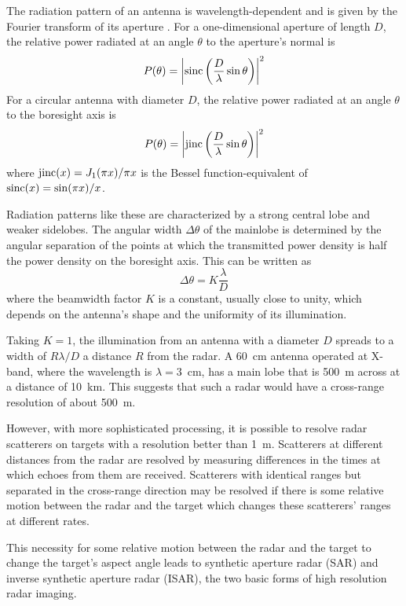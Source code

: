 The radiation pattern of an antenna is wavelength-dependent and is given 
by the Fourier transform of its aperture \cite{Bra86}.  For a one-dimensional
aperture of length $D$, the relative power radiated at an angle $\theta$ to 
the aperture's normal is
\begin{equation}
P(\theta)=\left|{\mathop{\rm sinc}\nolimits}\left(\frac{D}{\lambda}\sin\theta\right)\right|^2
\end{equation}
For a circular antenna with diameter $D$, the relative power radiated at an 
angle $\theta$ to the boresight axis is
\begin{equation}
P(\theta)=\left|{\mathop{\rm jinc}\nolimits}\left(\frac{D}{\lambda}\sin\theta\right)\right|^2
\end{equation}
where ${\mathop{\rm jinc}\nolimits}(x)=J_1(\pi x)/\pi x$ is the Bessel function-equivalent of 
${\mathop{\rm sinc}\nolimits}(x)=\sin(\pi x)/x$.  

Radiation patterns like these are characterized by a strong central lobe and
weaker sidelobes.  The angular width $\Delta\theta$ of the mainlobe is determined by the 
angular separation of the points at which the transmitted power density is half the 
power density on the boresight axis.  This can be written as \cite[eq. (6.11)]{Sko90}
\begin{equation}\label{hrr eqn:ant bw}
\Delta\theta=K\frac{\lambda}{D}
\end{equation}
where the beamwidth factor $K$ is a constant, usually close to unity, which
depends on the antenna's shape and the uniformity of its illumination.

Taking $K=1$, the illumination from an antenna with a diameter $D$ spreads to
a width of $R\lambda/D$ a distance $R$ from the radar.  A 60~cm antenna
operated at X-band, where the wavelength is $\lambda=3$~cm, has a main 
lobe that is 500~m across at a distance of 10~km.  This suggests that such a
radar would have a cross-range resolution of about 500~m.

However, with more sophisticated processing, it is possible to resolve
radar scatterers on targets with a resolution better than 1~m.
Scatterers at different distances from the radar are resolved by measuring
differences in the times at which echoes from them are received.  Scatterers
with identical ranges but separated in the cross-range direction may be
resolved if there is some relative motion between the radar and the target 
which changes these scatterers' ranges at different rates.

This necessity for some relative motion between the radar and the target to
change the target's aspect angle leads to synthetic aperture radar (SAR) and 
inverse synthetic aperture radar (ISAR), the two basic forms of high 
resolution radar imaging.

